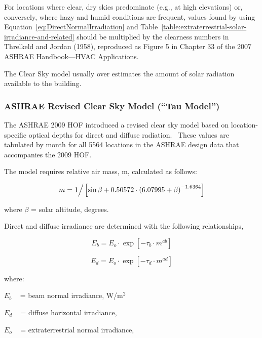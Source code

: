 For locations where clear, dry skies predominate (e.g., at high elevations) or, conversely, where hazy and humid conditions are frequent, values found by using Equation~\ref{eq:DirectNormalIrradiation} and Table~\ref{table:extraterrestrial-solar-irradiance-and-related} should be multiplied by the clearness numbers in Threlkeld and Jordan (1958), reproduced as Figure 5 in Chapter 33 of the 2007 ASHRAE Handbook---HVAC Applications.

The Clear Sky model usually over estimates the amount of solar radiation available to the building.

\subsubsection{ASHRAE Revised Clear Sky Model (``Tau Model'')}\label{ashrae-revised-clear-sky-model-tau-model}

The ASHRAE 2009 HOF introduced a revised clear sky model based on location-specific optical depths for direct and diffuse radiation.~ These values are tabulated by month for all 5564 locations in the ASHRAE design data that accompanies the 2009 HOF.

The model requires relative air mass, m, calculated as follows:

\begin{equation}
m = {1 \mathord{\left/ {\vphantom {1 {\left[ {\sin \beta  + 0.50572 \cdot {{\left( {6.07995 + \beta } \right)}^{ - 1.6364}}} \right]}}} \right. } {\left[ {\sin \beta  + 0.50572 \cdot {{\left( {6.07995 + \beta } \right)}^{ - 1.6364}}} \right]}}
\end{equation}

where \(\beta\) = solar altitude, degrees.

Direct and diffuse irradiance are determined with the following relationships,

\begin{equation}
{E_b} = {E_o} \cdot \exp \left[ { - {\tau_b} \cdot {m^{ab}}} \right]
\end{equation}

\begin{equation}
{E_d} = {E_o} \cdot \exp \left[ { - {\tau_d} \cdot {m^{ad}}} \right]
\end{equation}

where:

\({E_b}\) ~ = beam normal irradiance, W/m\(^{2}\)

\({E_d}\) ~ = diffuse horizontal irradiance,

\({E_o}\) ~ = extraterrestrial normal irradiance,

